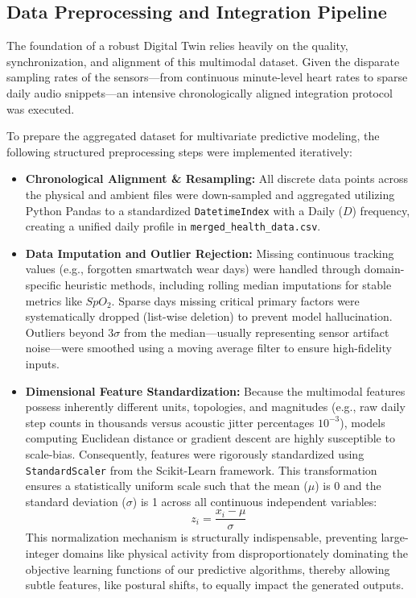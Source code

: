 \documentclass[11pt,a4paper]{article}
\begin{document}
\subsection{Data Preprocessing and Integration Pipeline}
The foundation of a robust Digital Twin relies heavily on the quality, synchronization, and alignment of this multimodal dataset. Given the disparate sampling rates of the sensors—from continuous minute-level heart rates to sparse daily audio snippets—an intensive chronologically aligned integration protocol was executed.

To prepare the aggregated dataset for multivariate predictive modeling, the following structured preprocessing steps were implemented iteratively:
\begin{itemize}
    \item \textbf{Chronological Alignment \& Resampling:} All discrete data points across the physical and ambient files were down-sampled and aggregated utilizing Python Pandas to a standardized \texttt{DatetimeIndex} with a Daily ($D$) frequency, creating a unified daily profile in \texttt{merged\_health\_data.csv}.
    \item \textbf{Data Imputation and Outlier Rejection:} Missing continuous tracking values (e.g., forgotten smartwatch wear days) were handled through domain-specific heuristic methods, including rolling median imputations for stable metrics like $SpO_2$. Sparse days missing critical primary factors were systematically dropped (list-wise deletion) to prevent model hallucination. Outliers beyond $3\sigma$ from the median—usually representing sensor artifact noise—were smoothed using a moving average filter to ensure high-fidelity inputs.
    \item \textbf{Dimensional Feature Standardization:} Because the multimodal features possess inherently different units, topologies, and magnitudes (e.g., raw daily step counts in thousands versus acoustic jitter percentages $10^{-3}$), models computing Euclidean distance or gradient descent are highly susceptible to scale-bias. Consequently, features were rigorously standardized using \texttt{StandardScaler} from the Scikit-Learn framework. This transformation ensures a statistically uniform scale such that the mean ($\mu$) is 0 and the standard deviation ($\sigma$) is 1 across all continuous independent variables:
    \begin{equation}
        z_i = \frac{x_i - \mu}{\sigma}
    \end{equation}
    This normalization mechanism is structurally indispensable, preventing large-integer domains like physical activity from disproportionately dominating the objective learning functions of our predictive algorithms, thereby allowing subtle features, like postural shifts, to equally impact the generated outputs.
\end{itemize}
\end{document}
